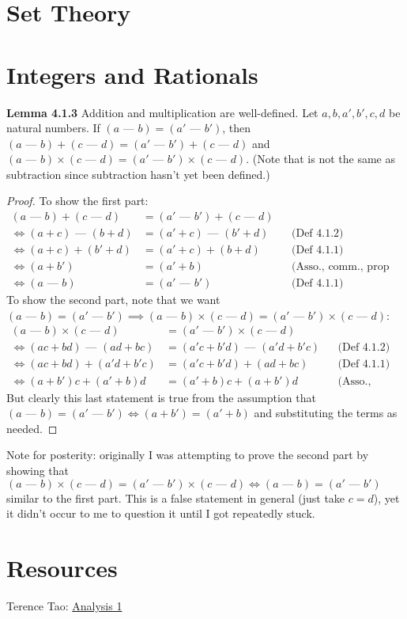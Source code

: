 \documentclass[answers,12pt]{exam}
\newcommand{\fakeminus}{\text{ --- }}
\begin{document}
\section{Set Theory}

\section{Integers and Rationals}
\textbf{Lemma 4.1.3} Addition and multiplication are well-defined.
Let $a,b,a',b',c,d$ be natural numbers.
If $(a \fakeminus b)=(a' \fakeminus b')$, then $(a \fakeminus b)+(c \fakeminus d)=(a' \fakeminus b')+(c \fakeminus d)$ and $(a \fakeminus b)\times(c \fakeminus d)=(a' \fakeminus b')\times(c \fakeminus d)$.
(Note that \fakeminus{} is not the same as subtraction since subtraction hasn't yet been defined.)

\begin{solution}
\begin{proof}
    To show the first part:
    \begin{align*}
        (a \fakeminus b) + (c \fakeminus d) &= (a' \fakeminus b') + (c \fakeminus d)\\
        \iff (a+c) \fakeminus (b+d) &= (a' + c) \fakeminus (b' + d) && \text{(Def 4.1.2)}\\
        \iff (a+c) + (b'+d) &= (a' + c) + (b + d)  && \text{(Def 4.1.1)}\\
        \iff (a+b') &= (a'+b)  && \text{(Asso., comm., prop 2.2.6)}\\
        \iff (a \fakeminus b) &= (a' \fakeminus b')  && \text{(Def 4.1.1)}
    \end{align*}
    To show the second part, note that we want $(a \fakeminus b) = (a' \fakeminus b') \implies (a \fakeminus b) \times (c \fakeminus d)  = (a' \fakeminus b') \times (c \fakeminus d)$:
    \begin{align*}
        (a \fakeminus b) \times (c \fakeminus d) &= (a' \fakeminus b') \times (c \fakeminus d) \\
        \iff (ac + bd) \fakeminus (ad + bc) &= (a'c + b'd) \fakeminus (a'd + b'c)&& \text{(Def 4.1.2)} \\
        \iff (ac + bd) + (a'd + b'c) &= (a'c + b'd) + (ad + bc) && \text{(Def 4.1.1)}\\
        \iff (a+b')c + (a'+b)d &= (a'+b)c + (a+b')d && \text{(Asso., comm., dist.)}
    \end{align*}
    But clearly this last statement is true from the assumption that $(a \fakeminus b) = (a' \fakeminus b') \iff (a + b') = (a' + b)$ and substituting the terms as needed.
\end{proof}

Note for posterity: originally I was attempting to prove the second part by showing that $(a \fakeminus b) \times (c \fakeminus d) = (a' \fakeminus b') \times (c \fakeminus d) \iff (a \fakeminus b) = (a' \fakeminus b')$ similar to the first part.
This is a false statement in general (just take $c = d$), yet it didn't occur to me to question it until I got repeatedly stuck.
\end{solution}



\section{Resources}
Terence Tao: \href{https://terrytao.wordpress.com/books/analysis-i/}{Analysis 1}
\end{document}
